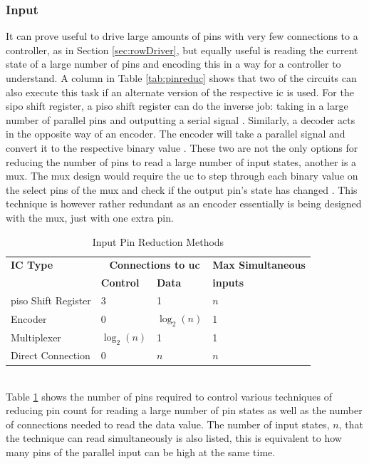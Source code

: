 \documentclass[12pt,a4paper]{report}
\begin{document}
\subsubsection{Input}
It can prove useful to drive large amounts of pins with very few connections to a controller, as in Section \ref{sec:rowDriver}, but equally useful is reading the current state of a large number of pins and encoding this in a way for a controller to understand. A column in Table \ref{tab:pinreduc} shows that two of the circuits can also execute this task if an alternate version of the respective \ac{ic} is used. For the \ac{sipo} shift register, a \ac{piso} shift register can do the inverse job: taking in a large number of parallel pins and outputting a serial signal \cite{PISOsrOpenMusic}. Similarly, a decoder acts in the opposite way of an encoder. The encoder will take a parallel signal and convert it to the respective binary value \cite{encoderExplan}. These two  are not the only options for reducing the number of pins to read a large number of input states, another is a \ac{mux}. The \ac{mux} design would require the \ac{uc} to step through each binary value on the select pins of the \ac{mux} and check if the output pin's state has changed \cite{DecoderMuxAoE}. This technique is however rather redundant as an encoder essentially is being designed with the \ac{mux}, just with one extra pin.\\
\begin{table}[h!]
	\centering
	\begin{tabular}{|p{3.9cm}|p{2.15cm}|p{2.15cm}|p{4cm}|}
		\hline 
		\textbf{IC Type} & \multicolumn{2}{c|}{\textbf{\textnumero \ Connections to \ac{uc}}}& \textbf{Max Simultaneous} \\ 
		& \multicolumn{1}{l}{\textbf{Control}} & \textbf{Data} & \textbf{inputs} \\
		\hline 
		\ac{piso} Shift Register & 3 & 1 & $n$ \\ 
		\hline 
		Encoder & 0 & $\log_2(n)$ & 1 \\ 
		\hline 
		Multiplexer & $\log_2(n)$ & 1 & 1 \\ 
		\hline 
		Direct Connection & 0 & $n$ & $n$ \\ 
		\hline 
	\end{tabular} 
	\caption{Input Pin Reduction Methods}
	\label{tab:inputpinreduc}
\end{table}\\
Table \ref{tab:inputpinreduc} shows the number of pins required to control various techniques of reducing pin count for reading a large number of pin states as well as the number of connections needed to read the data value. The number of input states, $n$, that the technique can read simultaneously is also listed, this is equivalent to how many pins of the parallel input can be high at the same time.
\end{document}
